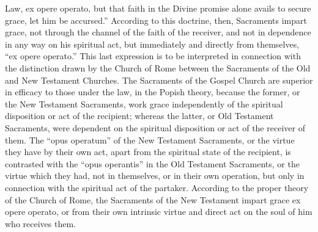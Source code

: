 \documentclass[]{book}
\begin{document}
Law, ex opere operato, but that faith in the Divine promise alone avails to secure grace, let him be accursed.'' According to this doctrine, then, Sacraments impart grace, not through the channel of the faith of the receiver, and not in dependence in any way on his spiritual act, but immediately and directly from themselves, ``ex opere operato.'' This last expression is to be interpreted in connection with the distinction drawn by the Church of Rome between the Sacraments of the Old and New Testament Churches. The Sacraments of the Gospel Church are superior in efficacy to those under the law, in the Popish theory, because the former, or the New Testament Sacraments, work grace independently of the spiritual disposition or act of the recipient; whereas the latter, or Old Testament Sacraments, were dependent on the spiritual disposition or act of the receiver of them. The ``opus operatum'' of the New Testament Sacraments, or the virtue they have by their own act, apart from the spiritual state of the recipient, is contrasted with the ``opus operantis'' in the Old Testament Sacraments, or the virtue which they had, not in themselves, or in their own operation, but only in connection with the spiritual act of the partaker. According to the proper theory of the Church of Rome, the Sacraments of the New Testament impart grace ex opere operato, or from their own intrinsic virtue and direct act on the soul of him who receives them.
\end{document}
